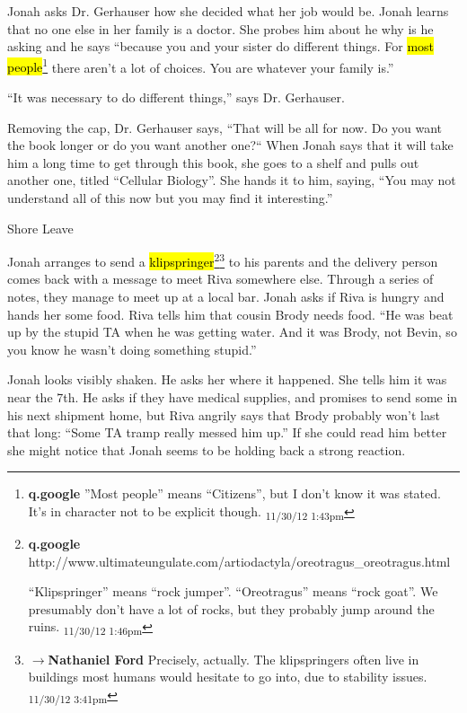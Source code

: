 Jonah asks Dr. Gerhauser how she decided what her job would be.  Jonah learns that no one else in her family is a doctor.  She probes him about he why is he asking and he says ``because you and your sister do different things.  For \hl{most people}\footnote{\textbf{q.google }''Most people'' means ``Citizens'', but I don't know it was stated.  It's in character not to be explicit though. \textsubscript{11/30/12 1:43pm}} there aren't a lot of choices.  You are whatever your family is.''

``It was necessary to do different things,'' says Dr. Gerhauser.



Removing the cap, Dr. Gerhauser says, ``That will be all for now.  Do you want the book longer or do you want another one?``  When Jonah says that it will take him a long time to get through this book, she goes to a shelf and pulls out another one, titled ``Cellular Biology''.  She hands it to him, saying, ``You may not understand all of this now but you may find it interesting.''



 {\LARGE Shore Leave } 



Jonah arranges to send a \hl{klipspringer}\footnote{\textbf{q.google }http://www.ultimateungulate.com/artiodactyla/oreotragus\_oreotragus.html

``Klipspringer'' means ``rock jumper''.  ``Oreotragus'' means ``rock goat''.  We presumably don't have a lot of rocks, but they probably jump around the ruins. \textsubscript{11/30/12 1:46pm}}\footnote{$\rightarrow$\textbf{Nathaniel Ford }Precisely, actually. The klipspringers often live in buildings most humans would hesitate to go into, due to stability issues. \textsubscript{11/30/12 3:41pm}} to his parents and the delivery person comes back with a message to meet Riva somewhere else.  Through a series of notes, they manage to meet up at a local bar.  Jonah asks if Riva is hungry and hands her some food.  Riva tells him that cousin Brody needs food. ``He was beat up by the stupid TA when he was getting water.  And it was Brody, not Bevin, so you know he wasn't doing something stupid.''



Jonah looks visibly shaken.  He asks her where it happened.  She tells him it was near the 7th.  He asks if they have medical supplies, and promises to send some in his next shipment home, but Riva angrily says that Brody probably won't last that long: ``Some TA tramp really messed him up.''  If she could read him better she might notice that Jonah seems to be holding back a strong reaction.



